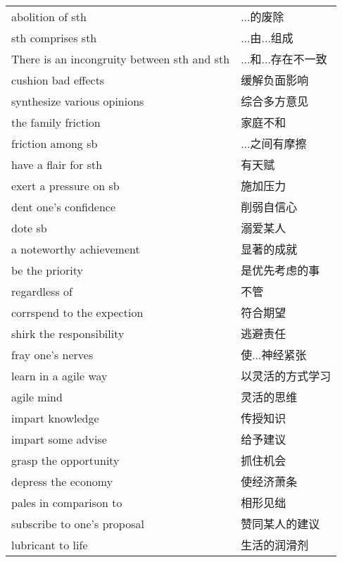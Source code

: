 \begin{tabular}{ll}
    abolition of sth                            & ...的废除       \\
    sth comprises sth                           & ...由...组成    \\
    There is an incongruity between sth and sth & ...和...存在不一致 \\
    cushion bad effects                         & 缓解负面影响       \\
    synthesize various opinions                 & 综合多方意见       \\

    the family friction                         & 家庭不和         \\
    friction among sb                           & ...之间有摩擦     \\
    have a flair for sth                        & 有天赋          \\
    exert a pressure on sb                      & 施加压力         \\
    dent one's confidence                       & 削弱自信心        \\
    dote sb                                     & 溺爱某人         \\
    a noteworthy achievement                    & 显著的成就        \\
    be the priority                             & 是优先考虑的事      \\
    regardless of                               & 不管           \\
    corrspend to the expection                  & 符合期望         \\
    shirk the responsibility                    & 逃避责任         \\
    fray one's nerves                           & 使...神经紧张     \\
    learn in a agile way                        & 以灵活的方式学习     \\
    agile mind                                  & 灵活的思维        \\
    impart knowledge                            & 传授知识         \\
    impart some advise                          & 给予建议         \\
    grasp the opportunity                       & 抓住机会         \\
    depress the economy                         & 使经济萧条        \\
    pales in comparison to                      & 相形见绌         \\
    subscribe to one's proposal                 & 赞同某人的建议      \\
    lubricant to life                           & 生活的润滑剂       \\
\end{tabular}

